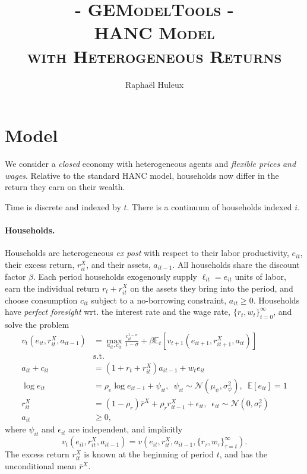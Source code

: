 \documentclass[12pt,english]{article}
\begin{document}
\title{{\large\textsc{- GEModelTools -}}\\
\textsc{HANC Model}\\
\textsc{with Heterogeneous Returns}}
\author{Rapha\"el Huleux}
\maketitle

\section*{Model}

We consider a \emph{closed} economy with heterogeneous agents and
\emph{flexible prices} \emph{and wages}. Relative to the standard
HANC model, households now differ in the return they earn on their
wealth.

Time is discrete and indexed by $t$. There is a continuum of households
indexed $i$.

\paragraph*{Households.}

Households are heterogeneous \emph{ex post} with respect to their
labor productivity, $e_{it}$, their excess return, $r^{X}_{it}$,
and their assets, $a_{it-1}$. All households share the discount factor
$\beta$. Each period households exogenously supply $\ell_{it}=e_{it}$
units of labor, earn the individual return $r_{t}+r^{X}_{it}$ on
the assets they bring into the period, and choose consumption $c_{it}$
subject to a no-borrowing constraint, $a_{it}\geq0$. Households have
\emph{perfect foresight} wrt. the interest rate and the wage rate,
$\{r_{t},w_{t}\}^{\infty}_{t=0}$, and solve the problem
\begin{align}
v_{t}(e_{it},r^{X}_{it},a_{it-1}) & =\max_{a_{it},c_{it}}\frac{c^{1-\sigma}_{it}}{1-\sigma}+\beta\mathbb{E}_{t}\left[v_{t+1}(e_{it+1},r^{X}_{it+1},a_{it})\right]\label{eq:Bellman}\\
 & \text{s.t.}\nonumber \\
a_{it}+c_{it} & =(1+r_{t}+r^{X}_{it})a_{it-1}+w_{t}e_{it}\nonumber \\
\log e_{it} & =\rho_{e}\log e_{it-1}+\psi_{it},\,\,\,\psi_{it}\sim\mathcal{N}(\mu_{\psi},\sigma^{2}_{\psi}),\,\,\,\mathbb{E}[e_{it}]=1\nonumber \\
r^{X}_{it} & =(1-\rho_{r})\bar{r}^{X}+\rho_{r}r^{X}_{it-1}+\epsilon_{it},\,\,\,\epsilon_{it}\sim\mathcal{N}(0,\sigma^{2}_{r})\nonumber \\
a_{it} & \geq0,\nonumber
\end{align}
where $\psi_{it}$ and $\epsilon_{it}$ are independent, and implicitly
\[
v_{t}(e_{it},r^{X}_{it},a_{it-1})=v(e_{it},r^{X}_{it},a_{it-1},\{r_{\tau},w_{\tau}\}^{\infty}_{\tau=t}).
\]
The excess return $r^{X}_{it}$ is known at the beginning of period
$t$, and has the unconditional mean $\bar{r}^{X}$.
\end{document}
